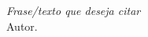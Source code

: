
\chapter*{}
\vspace{15cm}
\begin{flushright}
	\textit
	{
		Frase/texto que deseja citar
	}\medskip\\ 
	Autor.
\end{flushright}